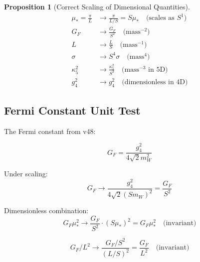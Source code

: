 \documentclass[11pt,a4paper]{article}
\theoremstyle{definition}
\newtheorem{proposition}[theorem]{Proposition}
\begin{document}
\begin{proposition}[Correct Scaling of Dimensional Quantities]
\label{prop:dim_scaling}
\begin{align}
\label{eq:dim_mu_star}
\mu_* = \frac{\pi}{L} &\to \frac{\pi}{L/S} = S \mu_* \quad \text{(scales as $S^1$)} \\
\label{eq:dim_GF}
G_F &\to \frac{G_F}{S^2} \quad \text{(mass$^{-2}$)} \\
\label{eq:dim_L}
L &\to \frac{L}{S} \quad \text{(mass$^{-1}$)} \\
\label{eq:dim_sigma}
\sigma &\to S^4 \sigma \quad \text{(mass$^4$)} \\
\label{eq:dim_kappa5}
\kappa_5^2 &\to \frac{\kappa_5^2}{S^3} \quad \text{(mass$^{-3}$ in 5D)} \\
\label{eq:dim_g4}
g_4^2 &\to g_4^2 \quad \text{(dimensionless in 4D)}
\end{align}
\end{proposition}

\subsection{Fermi Constant Unit Test}
\label{subsec:GF_unit_test}

The Fermi constant from v48:

\begin{equation}
\label{eq:GF_def}
G_F = \frac{g_4^2}{4\sqrt{2} m_W^2}
\end{equation}

Under scaling:
\begin{equation}
\label{eq:GF_scale}
G_F \to \frac{g_4^2}{4\sqrt{2} (S m_W)^2} = \frac{G_F}{S^2}
\end{equation}

Dimensionless combination:
\begin{equation}
\label{eq:GF_dimless}
G_F \mu_*^2 \to \frac{G_F}{S^2} \cdot (S\mu_*)^2 = G_F \mu_*^2 \quad \text{(invariant)}
\end{equation}

\begin{equation}
\label{eq:GF_L_dimless}
G_F / L^2 \to \frac{G_F/S^2}{(L/S)^2} = \frac{G_F}{L^2} \quad \text{(invariant)}
\end{equation}

\end{document}
